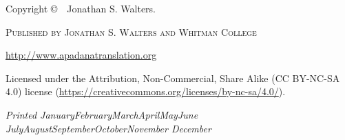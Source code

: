 \newcommand{\monthyear}{%
  \ifcase\month\or January\or February\or March\or April\or May\or June\or
  July\or August\or September\or October\or November\or
  December\fi\space\number\year
}

\newpage
\thispagestyle{empty}

\begin{flushleft}

\vspace*{\fill}

Copyright \copyright\ \the\year\ Jonathan S. Walters.

\par\textsc{Published by Jonathan S. Walters and Whitman College}

\par\url{http://www.apadanatranslation.org}

\par Licensed under the Attribution, Non-Commercial, Share Alike (\textsc{CC BY-NC-SA 4.0}) license (\url{https://creativecommons.org/licenses/by-nc-sa/4.0/}).

\par\textit{Printed \monthyear}

\end{flushleft}

\newpage
